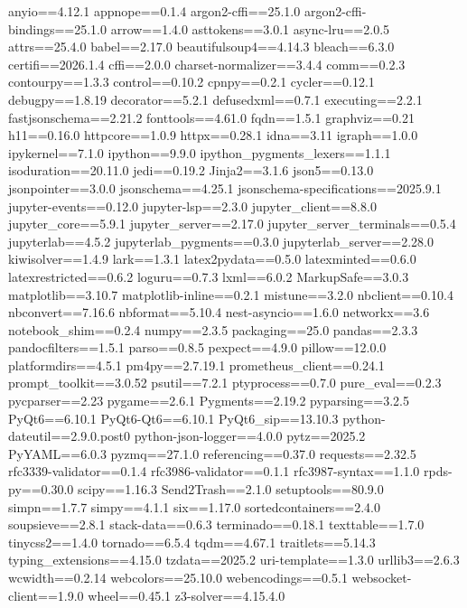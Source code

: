 anyio==4.12.1
appnope==0.1.4
argon2-cffi==25.1.0
argon2-cffi-bindings==25.1.0
arrow==1.4.0
asttokens==3.0.1
async-lru==2.0.5
attrs==25.4.0
babel==2.17.0
beautifulsoup4==4.14.3
bleach==6.3.0
certifi==2026.1.4
cffi==2.0.0
charset-normalizer==3.4.4
comm==0.2.3
contourpy==1.3.3
control==0.10.2
cpnpy==0.2.1
cycler==0.12.1
debugpy==1.8.19
decorator==5.2.1
defusedxml==0.7.1
executing==2.2.1
fastjsonschema==2.21.2
fonttools==4.61.0
fqdn==1.5.1
graphviz==0.21
h11==0.16.0
httpcore==1.0.9
httpx==0.28.1
idna==3.11
igraph==1.0.0
ipykernel==7.1.0
ipython==9.9.0
ipython_pygments_lexers==1.1.1
isoduration==20.11.0
jedi==0.19.2
Jinja2==3.1.6
json5==0.13.0
jsonpointer==3.0.0
jsonschema==4.25.1
jsonschema-specifications==2025.9.1
jupyter-events==0.12.0
jupyter-lsp==2.3.0
jupyter_client==8.8.0
jupyter_core==5.9.1
jupyter_server==2.17.0
jupyter_server_terminals==0.5.4
jupyterlab==4.5.2
jupyterlab_pygments==0.3.0
jupyterlab_server==2.28.0
kiwisolver==1.4.9
lark==1.3.1
latex2pydata==0.5.0
latexminted==0.6.0
latexrestricted==0.6.2
loguru==0.7.3
lxml==6.0.2
MarkupSafe==3.0.3
matplotlib==3.10.7
matplotlib-inline==0.2.1
mistune==3.2.0
nbclient==0.10.4
nbconvert==7.16.6
nbformat==5.10.4
nest-asyncio==1.6.0
networkx==3.6
notebook_shim==0.2.4
numpy==2.3.5
packaging==25.0
pandas==2.3.3
pandocfilters==1.5.1
parso==0.8.5
pexpect==4.9.0
pillow==12.0.0
platformdirs==4.5.1
pm4py==2.7.19.1
prometheus_client==0.24.1
prompt_toolkit==3.0.52
psutil==7.2.1
ptyprocess==0.7.0
pure_eval==0.2.3
pycparser==2.23
pygame==2.6.1
Pygments==2.19.2
pyparsing==3.2.5
PyQt6==6.10.1
PyQt6-Qt6==6.10.1
PyQt6_sip==13.10.3
python-dateutil==2.9.0.post0
python-json-logger==4.0.0
pytz==2025.2
PyYAML==6.0.3
pyzmq==27.1.0
referencing==0.37.0
requests==2.32.5
rfc3339-validator==0.1.4
rfc3986-validator==0.1.1
rfc3987-syntax==1.1.0
rpds-py==0.30.0
scipy==1.16.3
Send2Trash==2.1.0
setuptools==80.9.0
simpn==1.7.7
simpy==4.1.1
six==1.17.0
sortedcontainers==2.4.0
soupsieve==2.8.1
stack-data==0.6.3
terminado==0.18.1
texttable==1.7.0
tinycss2==1.4.0
tornado==6.5.4
tqdm==4.67.1
traitlets==5.14.3
typing_extensions==4.15.0
tzdata==2025.2
uri-template==1.3.0
urllib3==2.6.3
wcwidth==0.2.14
webcolors==25.10.0
webencodings==0.5.1
websocket-client==1.9.0
wheel==0.45.1
z3-solver==4.15.4.0
